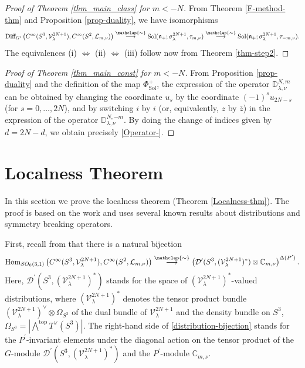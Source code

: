 \documentclass[12pt, pdflatex, a4paper]{article}
\theoremstyle{plain}
\theoremstyle{definition}
\def\C{{\mathbb C}}
\def\Diff{\text{\normalfont{Diff}}}
\def\D{\mathbb{D}}
\def\Dist{\mathcal{D}^\prime}
\def\Hom{\text{\normalfont{Hom}}}
\def\L{\mathcal{L}}
\def\n{\mathfrak{n}}
\def\Sol{\text{\normalfont{Sol}}}
\def\V{\mathcal{V}}
\newcommand\arrowsimeq{\stackrel{\mathclap{\thicksim}}{\longrightarrow}}
\begin{document}
\begin{proof}[Proof of Theorem \ref{thm_main_class} for $m < -N$]
From Theorem \ref{F-method-thm} and Proposition \ref{prop-duality}, we have isomorphisms
\begin{equation*}
\Diff_{G^\prime}\left(C^\infty(S^3, \V_\lambda^{2N+1}), C^\infty(S^2, \L_{m,\nu})\right) \arrowsimeq \Sol(\n_+; \sigma_\lambda^{2N+1}, \tau_{m, \nu}) \arrowsimeq \Sol(\n_+; \sigma_\lambda^{2N+1}, \tau_{-m, \nu}).
\end{equation*}
The equivalences (i) $\Leftrightarrow$ (ii) $\Leftrightarrow$ (iii) follow now from Theorem \ref{thm-step2}.
\end{proof}

\begin{proof}[Proof of Theorem \ref{thm_main_const} for $m < -N$]
From Proposition \ref{prop-duality} and the definition of the map $\Phi^+_\text{Sol}$, the expression of the operator $\D_{\lambda, \nu}^{N, m}$ can be obtained by changing the coordinate $u_s$ by the coordinate $(-1)^s u_{2N-s}$ (for $s=0, \ldots, 2N$), and by switching $i$ by $i$ (or, equivalently, $z$ by $\overline{z}$) in the expression of the operator $\D_{\lambda, \nu}^{N, -m}$. By doing the change of indices given by $d = 2N-d$, we obtain precisely \eqref{Operator-}.
\end{proof}

\section{Localness Theorem}\label{section-localnessthm}
In this section we prove the localness theorem (Theorem \ref{Localness-thm}). The proof is based on the work \cite{KS15, KS18} and uses several known results about distributions and symmetry breaking operators.

First, recall from \cite[Fact 5.1]{KS18} that there is a natural bijection
\begin{equation}\label{distribution-bijection}
\begin{aligned}
\Hom_{SO_0(3,1)}\left(C^\infty(S^3, \V_\lambda^{2N+1}), C^\infty(S^2, \L_{m,\nu})\right) \arrowsimeq \left(\Dist(S^3, (\V_\lambda^{2N+1})^*) \otimes \C_{m, \nu}\right)^{ \Delta(P^\prime)}.
\end{aligned}
\end{equation}
Here, $\Dist(S^3, (\V_\lambda^{2N+1})^*)$ stands for the space of $(\V_\lambda^{2N+1})^*$-valued distributions, where $(\V_\lambda^{2N+1})^*$ denotes the tensor product bundle $(\V_\lambda^{2N+1})^\vee \otimes \Omega_{S^3}$ of the dual bundle of $\V_\lambda^{2N+1}$ and the density bundle on $S^3$, $\Omega_{S^3} = |\bigwedge^\text{top} T^\vee(S^3)|$. The right-hand side of \eqref{distribution-bijection} stands for the $P^\prime$-invariant elements under the diagonal action on the tensor product of the $G$-module $\Dist(S^3, (\V_\lambda^{2N+1})^*)$ and the $P^\prime$-module $\C_{m,\nu}$.
\end{document}
